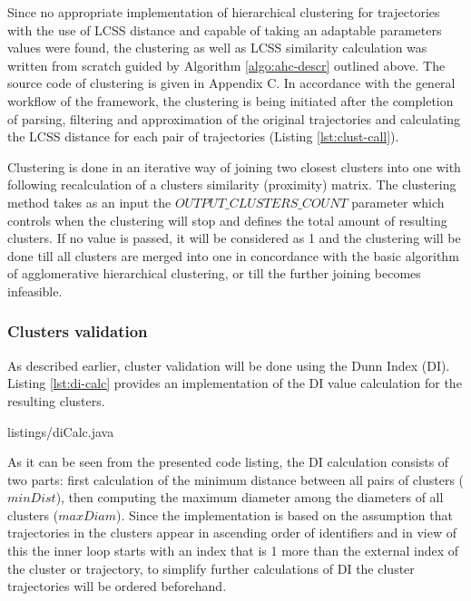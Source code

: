 Since no appropriate implementation of hierarchical clustering for trajectories with the use of LCSS distance and capable of taking an adaptable parameters values were found, the clustering as well as LCSS similarity calculation was written from scratch guided by Algorithm \ref{algo:ahc-descr} outlined above. The source code of clustering is given in Appendix C. In accordance with the general workflow of the framework, the clustering is being initiated after the completion of parsing, filtering and approximation of the original trajectories and calculating the LCSS distance for each pair of trajectories (Listing \ref{lst:clust-call}).



Clustering is done in an iterative way of joining two closest clusters into one with following recalculation of a clusters similarity (proximity) matrix. The clustering method takes as an input the $OUTPUT\_CLUSTERS\_COUNT$ parameter which controls when the clustering will stop and defines the total amount of resulting clusters. If no value is passed, it will be considered as 1 and the clustering will be done till all clusters are merged into one in concordance with the basic algorithm of agglomerative hierarchical clustering, or till the further joining becomes infeasible.

\subsubsection{Clusters validation}

As described earlier, cluster validation will be done using the Dunn Index (DI). Listing \ref{lst:di-calc} provides an implementation of the DI value calculation for the resulting clusters.

 {listings/diCalc.java}

As it can be seen from the presented code listing, the DI calculation consists of two parts: first calculation of the minimum distance between all pairs of clusters ($minDist$), then computing the maximum diameter among the diameters of all clusters ($maxDiam$). Since the implementation is based on the assumption that trajectories in the clusters appear in ascending order of identifiers and in view of this the inner loop starts with an index that is 1 more than the external index of the cluster or trajectory, to simplify further calculations of DI the cluster trajectories will be ordered beforehand.

